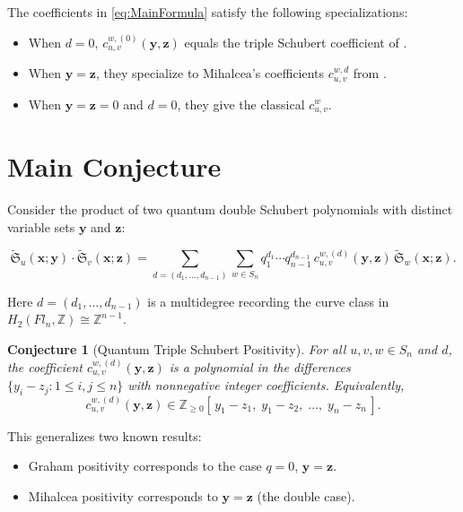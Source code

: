 \documentclass[12pt]{amsart}
\newtheorem{conjecture}{Conjecture}
\begin{document}
The coefficients in \cref{eq:MainFormula} satisfy the following specializations:
\begin{itemize}
\item When $d=0$, $c_{u,v}^{w,(0)}(\mathbf{y},\mathbf{z})$ equals the triple Schubert
coefficient of \cite{GX2025}.
\item When $\mathbf{y}=\mathbf{z}$, they specialize to Mihalcea's coefficients
$c_{u,v}^{w,d}$ from \cite{Mihalcea}.
\item When $\mathbf{y}=\mathbf{z}=0$ and $d=0$, they give the classical $c_{u,v}^w$.
\end{itemize}

\section{Main Conjecture}
\label{sec:main-conjecture}

Consider the product of two quantum double Schubert polynomials with distinct variable sets
$\mathbf{y}$ and $\mathbf{z}$:

\begin{equation}
\widetilde{\mathfrak{S}}_u(\mathbf{x};\mathbf{y})\cdot
\widetilde{\mathfrak{S}}_v(\mathbf{x};\mathbf{z})
= \sum_{d=(d_1,\ldots,d_{n-1})} \sum_{w\in S_n}
q_1^{d_1}\cdots q_{n-1}^{d_{n-1}}\,
c_{u,v}^{w,(d)}(\mathbf{y},\mathbf{z})\,
\widetilde{\mathfrak{S}}_w(\mathbf{x};\mathbf{z}).
\label{eq:MainFormula}
\end{equation}

Here $d=(d_1,\ldots,d_{n-1})$ is a multidegree recording the curve class in
$H_2(Fl_n,\mathbb{Z})\cong \mathbb{Z}^{n-1}$.

\begin{conjecture}[Quantum Triple Schubert Positivity]\label{conj:MainFormal}
For all $u,v,w\in S_n$ and $d$, the coefficient
$c_{u,v}^{w,(d)}(\mathbf{y},\mathbf{z})$ is a polynomial in the differences
$\{y_i-z_j : 1\le i,j\le n\}$ with nonnegative integer coefficients.
Equivalently,
\[
c_{u,v}^{w,(d)}(\mathbf{y},\mathbf{z})
\in \mathbb{Z}_{\ge 0}[\,y_1-z_1,\; y_1-z_2,\;\ldots,\;y_n-z_n\,].
\]
\end{conjecture}

This generalizes two known results:
\begin{itemize}
\item Graham positivity \cite{Gr} corresponds to the case $q=0$, $\mathbf{y}=\mathbf{z}$.
\item Mihalcea positivity \cite{Mihalcea} corresponds to $\mathbf{y}=\mathbf{z}$ (the double case).
\end{itemize}
\end{document}

